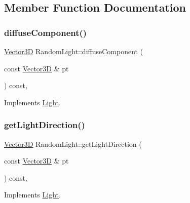 \subsection{Member Function Documentation}
\mbox{\label{classRandomLight_a371cbc5df30db46ac53cd0a9be91ac52}} 
\subsubsection{\texorpdfstring{diffuseComponent()}{diffuseComponent()}}
{\footnotesize\ttfamily \mbox{\hyperlink{classVector3D}{Vector3D}} Random\+Light\+::diffuse\+Component (\begin{DoxyParamCaption}\item[{const \mbox{\hyperlink{classVector3D}{Vector3D}} \&}]{pt }\end{DoxyParamCaption}) const\hspace{0.3cm}{\ttfamily [override]}, {\ttfamily [virtual]}}



Implements \mbox{\hyperlink{classLight_af5dc859ada149ca54ec5088e1c33deb4}{Light}}.

\mbox{\label{classRandomLight_a70c038d63e66f520a296dccddcf9035f}} 
\subsubsection{\texorpdfstring{getLightDirection()}{getLightDirection()}}
{\footnotesize\ttfamily \mbox{\hyperlink{classVector3D}{Vector3D}} Random\+Light\+::get\+Light\+Direction (\begin{DoxyParamCaption}\item[{const \mbox{\hyperlink{classVector3D}{Vector3D}} \&}]{pt }\end{DoxyParamCaption}) const\hspace{0.3cm}{\ttfamily [override]}, {\ttfamily [virtual]}}



Implements \mbox{\hyperlink{classLight_ac075908cf22e9ca9f289c1226d133664}{Light}}.

\mbox{\label{classRandomLight_a93dbec116e6de441d4f0bd090a83e985}} 
